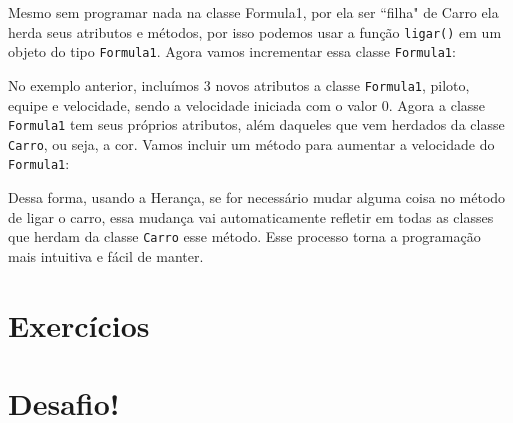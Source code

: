 

Mesmo sem programar nada na classe Formula1, por ela ser ``filha" de Carro ela herda 
seus atributos e métodos, por isso podemos usar a função \texttt{ligar()} em um objeto do tipo 
\texttt{Formula1}. Agora vamos incrementar essa classe \texttt{Formula1}:



No exemplo anterior, incluímos 3 novos atributos a classe \texttt{Formula1}, piloto, equipe e velocidade, 
sendo a velocidade iniciada com o valor 0. Agora a classe \texttt{Formula1} tem seus próprios atributos, 
além daqueles que vem herdados da classe \texttt{Carro}, ou seja, a cor. Vamos incluir um método para 
aumentar a velocidade do \texttt{Formula1}:



Dessa forma, usando a Herança, se for necessário mudar alguma coisa no método de ligar o carro, 
essa mudança vai automaticamente refletir em todas as classes que herdam da classe \texttt{Carro} 
esse método. Esse processo torna a programação mais intuitiva e fácil de manter. 

\section{Exercícios}
\label{cap11-exercicios}

\section{Desafio!}
\label{cap11-desafio}